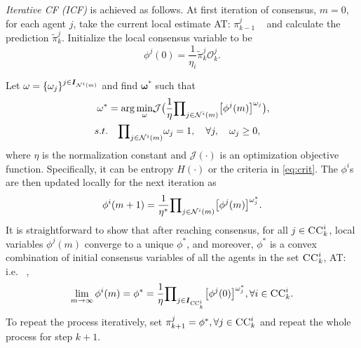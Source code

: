 \documentclass[conference]{IEEEtran}
\newcommand{\vect}[1]{{\mathbf{#1}}}
\theoremstyle{remark}
\newcommand{\axx}[1]{{\color{blue} AT: #1  \ }}  %
\newcommand{\bIs}[1]{\boldsymbol{I}_{#1}}  %
\newcommand{\suf}[1]{\textsc{\tiny #1}}  %
\begin{document}
\emph{Iterative CF (ICF)} is achieved as follows. At  first 
iteration of consensus, $m=0$, for each agent $j$, take the current local 
estimate \axx{${\pi}_{k-1}^j$} and calculate the prediction $\tilde{\pi}_k^j$. 
Initialize the local 
consensus variable to be  $$\mathcal{\phi}^j(0) 
=\frac{1}{\eta_i}\tilde{\pi}_k^j\mathcal{O}_k^j. $$ 

Let $\vect{\omega}= \{\omega_{j}\}^{j\in\bIs{{\cal N}^{i}(m)}}$ and find 
$\vect{\omega}^*$ such 
that 
\begin{equation}
\label{eq:opt_problem}
\begin{aligned}
\vect{\omega}^* &= { \arg \min_{\omega}}  \mathcal{J} \big( \frac{1}{\eta} {\prod\nolimits_{j \in {\cal N}^{i}(m)} }  \big[\mathcal{\phi}^j(m)\big]^{\omega_{j}} \big), \\
s.t. &\quad  {\prod\nolimits_{j \in {\cal N}^{i}(m)}} \omega_{j}= 1, \quad \forall j, \quad \omega_j\geq 0,
\end{aligned}
\end{equation}
where $\eta$ is the normalization constant and $\mathcal{J}(\cdot)$ is an 
optimization objective function. Specifically, it can be entropy $H(\cdot)$ or 
the criteria in \eqref{eq:crit}. The $\mathcal{\phi}^i$s are then updated locally 
for the next iteration as
\begin{equation}
\mathcal{\phi}^i(m + 1) = 	\frac{1}{\eta^*} {\prod\nolimits_{j \in {\cal N}^{i}(m)} }  \big[\mathcal{\phi}^j(m)\big]^{\omega_{j}^*}.
\end{equation}
It is straightforward to show that after reaching consensus, 
for all $j \in \textsc{CC}^i_k$, local variables $\mathcal{\phi}^j(m)$ converge 
to a unique $\mathcal{\phi}^*$, and moreover, $\mathcal{\phi}^*$ is
a convex combination of initial consensus 
variables of all the agents in the set $\textsc{CC}^i_k$, \axx{i.e.},
\begin{equation}
\lim\limits_{m\rightarrow 
	\infty}\vect{\phi}^{i}(m) = \mathcal{\phi}^*=	
\frac{1}{\eta} 
{\prod\nolimits_{j \in \bIs{\suf{CC}^i_k} } }  
\big[\mathcal{\phi}^j(0)\big]^{\omega_{j}^*},\forall i \in \textsc{CC}^i_k.
\end{equation}
To repeat the process iteratively, set ${\pi}_{k+1}^j = \mathcal{\phi}^*, \forall j \in \textsc{CC}^i_k$ and 
repeat the whole process for step $k+1$.
\end{document}

